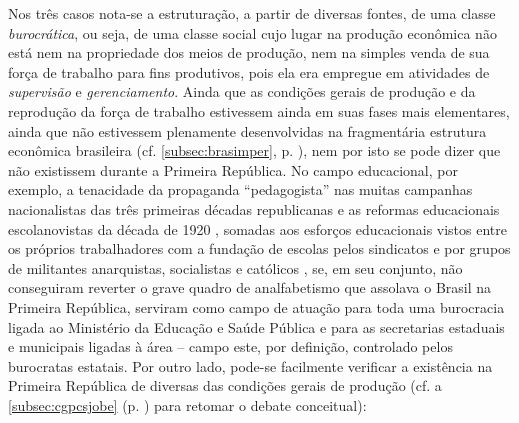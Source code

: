 Nos três casos nota-se a estruturação, a partir de diversas fontes, de uma classe \textit{burocrática}, ou seja, de uma classe social cujo lugar na produção econômica não está nem na propriedade dos meios de produção, nem na simples venda de sua força de trabalho para fins produtivos, pois ela era empregue em atividades de \textit{supervisão} e \textit{gerenciamento}. Ainda que as condições gerais de produção e da reprodução da força de trabalho estivessem ainda em suas fases mais elementares, ainda que não estivessem plenamente desenvolvidas na fragmentária estrutura econômica brasileira (cf. \autoref{subsec:brasimper}, p. \pageref{subsec:brasimper}), nem por isto se pode dizer que não existissem durante a Primeira República. No campo educacional, por exemplo, a tenacidade da propaganda ``pedagogista'' nas muitas campanhas nacionalistas das três primeiras décadas republicanas e as reformas educacionais escolanovistas da década de 1920 \cite{nagle_educacao_1977}, somadas aos esforços educacionais vistos entre os próprios trabalhadores com a fundação de escolas pelos sindicatos e por grupos de militantes anarquistas, socialistas e católicos \cite{andradeneto_educana_2014,ghiraldelli_educmovop_1987}, se, em seu conjunto, não conseguiram reverter o grave quadro de analfabetismo que assolava o Brasil na Primeira República, serviram como campo de atuação para toda uma burocracia ligada ao Ministério da Educação e Saúde Pública e para as secretarias estaduais e municipais ligadas à área -- campo este, por definição, controlado pelos burocratas estatais. Por outro lado, pode-se facilmente verificar a existência na Primeira República de diversas das condições gerais de produção (cf. a \autoref{subsec:cgpcsjobe} (p. \pageref{subsec:cgpcsjobe}) para retomar o debate conceitual):

